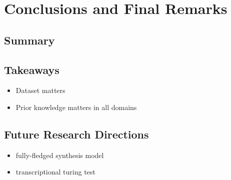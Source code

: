
\graphicspath{{8-conclusions/figures/}}

\chapter{Conclusions and Final Remarks}
\label{ch:conclusions}

\section{Summary}

\section{Takeaways}

\begin{itemize}
	\item Dataset matters
	\item Prior knowledge matters in all domains
\end{itemize}


\section{Future Research Directions}

\begin{itemize}
	\item fully-fledged synthesis model
	\item transcriptional turing test
\end{itemize}
